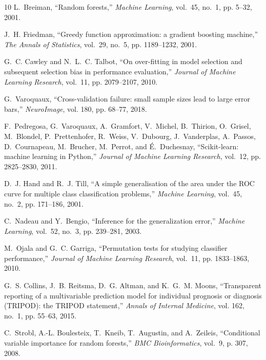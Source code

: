 \documentclass[conference]{IEEEtran}
\begin{document}
\begin{thebibliography}{10}
L.~Breiman, ``Random forests,'' \emph{Machine Learning}, vol.~45, no.~1, pp.
  5--32, 2001.

J.~H. Friedman, ``Greedy function approximation: a gradient boosting machine,''
  \emph{The Annals of Statistics}, vol.~29, no.~5, pp. 1189--1232, 2001.

G.~C. Cawley and N.~L.~C. Talbot, ``On over-fitting in model selection and
  subsequent selection bias in performance evaluation,'' \emph{Journal of
  Machine Learning Research}, vol.~11, pp. 2079--2107, 2010.

G.~Varoquaux, ``Cross-validation failure: small sample sizes lead to large
  error bars,'' \emph{NeuroImage}, vol. 180, pp. 68--77, 2018.

F.~Pedregosa, G.~Varoquaux, A.~Gramfort, V.~Michel, B.~Thirion, O.~Grisel,
  M.~Blondel, P.~Prettenhofer, R.~Weiss, V.~Dubourg, J.~Vanderplas, A.~Passos,
  D.~Cournapeau, M.~Brucher, M.~Perrot, and {\'E}.~Duchesnay, ``Scikit-learn:
  machine learning in {Python},'' \emph{Journal of Machine Learning Research},
  vol.~12, pp. 2825--2830, 2011.

D.~J. Hand and R.~J. Till, ``A simple generalisation of the area under the
  {ROC} curve for multiple class classification problems,'' \emph{Machine
  Learning}, vol.~45, no.~2, pp. 171--186, 2001.

C.~Nadeau and Y.~Bengio, ``Inference for the generalization error,''
  \emph{Machine Learning}, vol.~52, no.~3, pp. 239--281, 2003.

M.~Ojala and G.~C. Garriga, ``Permutation tests for studying classifier
  performance,'' \emph{Journal of Machine Learning Research}, vol.~11, pp.
  1833--1863, 2010.

G.~S. Collins, J.~B. Reitsma, D.~G. Altman, and K.~G.~M. Moons, ``Transparent
  reporting of a multivariable prediction model for individual prognosis or
  diagnosis ({TRIPOD}): the {TRIPOD} statement,'' \emph{Annals of Internal
  Medicine}, vol. 162, no.~1, pp. 55--63, 2015.

C.~Strobl, A.-L. Boulesteix, T.~Kneib, T.~Augustin, and A.~Zeileis,
  ``Conditional variable importance for random forests,'' \emph{BMC
  Bioinformatics}, vol.~9, p. 307, 2008.

\end{thebibliography}
\end{document}
